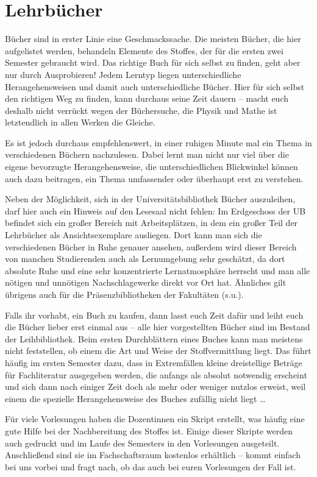 \section{Lehrbücher}

Bücher sind in erster Linie eine Geschmackssache. Die meisten Bücher, die hier aufgelistet werden, behandeln Elemente des Stoffes, der für die ersten zwei Semester gebraucht wird. Das richtige Buch für sich selbst zu finden, geht aber nur durch Ausprobieren! Jedem Lerntyp liegen unterschiedliche Herangehensweisen und damit auch unterschiedliche Bücher. Hier für sich selbst den richtigen Weg zu finden, kann durchaus seine Zeit dauern -- macht euch deshalb nicht verrückt wegen der Büchersuche, die Physik und Mathe ist letztendlich in allen Werken die Gleiche.

Es ist jedoch durchaus empfehlenswert, in einer ruhigen Minute mal ein Thema in verschiedenen Büchern nachzulesen. Dabei lernt man nicht nur viel über die eigene bevorzugte Herangehensweise, die unterschiedlichen Blickwinkel können auch dazu beitragen, ein Thema umfassender oder überhaupt erst zu verstehen.

Neben der Möglichkeit, sich in der Universitätsbibliothek Bücher auszuleihen, darf hier auch ein Hinweis auf den Lesesaal nicht fehlen: Im Erdgeschoss der UB befindet sich ein großer Bereich mit Arbeitsplätzen, in dem ein großer Teil der Lehrbücher als Ansichtsexemplare ausliegen. Dort kann man sich die verschiedenen Bücher in Ruhe genauer ansehen, außerdem wird dieser Bereich von manchen Studierenden auch als Lernumgebung sehr geschätzt, da dort absolute Ruhe und eine sehr konzentrierte Lernatmosphäre herrscht und man alle nötigen und unnötigen Nachschlagewerke direkt vor Ort hat. Ähnliches gilt übrigens auch für die Präsenzbibliotheken der Fakultäten (s.u.).

Falls ihr vorhabt, ein Buch zu kaufen, dann lasst euch Zeit dafür und leiht euch die Bücher lieber erst einmal aus -- alle hier vorgestellten Bücher sind im Bestand der Leihbibliothek. Beim ersten Durchblättern eines Buches kann man meistens nicht feststellen, ob einem die Art und Weise der Stoffvermittlung liegt. Das führt häufig im ersten Semester dazu, dass in Extremfällen kleine dreistellige Beträge für Fachliteratur ausgegeben werden, die anfangs als absolut notwendig erscheint und sich dann nach einiger Zeit doch als mehr oder weniger nutzlos erweist, weil einem die spezielle Herangehensweise des Buches zufällig nicht liegt \dots

Für viele Vorlesungen haben die Dozentinnen ein Skript erstellt, was häufig eine gute Hilfe bei der Nachbereitung des Stoffes ist. Einige dieser Skripte werden auch gedruckt und im Laufe des Semesters in den Vorlesungen ausgeteilt. Anschließend sind sie im Fachschaftsraum kostenlos erhältlich -- kommt einfach bei uns vorbei und fragt nach, ob das auch bei euren Vorlesungen der Fall ist.

